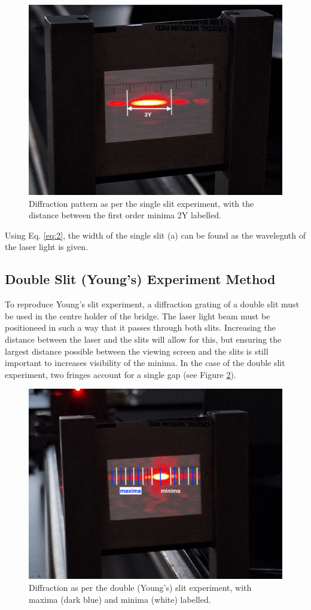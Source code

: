 \documentclass[12pt]{article}
\begin{document}
\begin{figure}[H]
    \centering
    \includegraphics[width=.6\textwidth]{single slit diffraction.jpeg}
    \caption{Diffraction pattern as per the single slit experiment, with the distance between the first order minima 2Y labelled.}
    \label{fig:8}
\end{figure}

Using Eq. \ref{eq:2}, the width of the single slit (a) can be found as the wavelegnth of the laser light is given.

\subsection{Double Slit (Young's) Experiment Method} \label{sec:2.2}

To reproduce Young's slit experiment, a diffraction grating of a double slit must be used in the centre holder of the bridge. The laser light beam must be positioneed in such a way that it passes through both slits. Increasing the distance between the laser and the slits
will allow for this, but ensuring the largest distance possible between the viewing screen and the slits is still important to increases visibility of the minima. In the case of the double slit experiment,
two fringes account for a single gap (see Figure \ref{fig:9}).

\begin{figure}[H]
    \centering
    \includegraphics[width=.6\textwidth]{young diffraction.jpeg}
    \caption{Diffraction as per the double (Young's) slit experiment, with maxima (dark blue) and minima (white) labelled.}
    \label{fig:9}
\end{figure}
\end{document}
